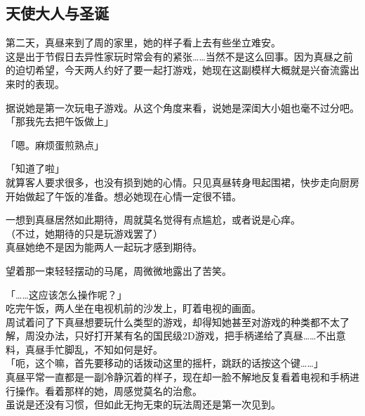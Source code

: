 \subsection{天使大人与圣诞}

第二天，真昼来到了周的家里，她的样子看上去有些坐立难安。\\

这是出于节假日去异性家玩时常会有的紧张……当然不是这么回事。因为真昼之前的迫切希望，今天两人约好了要一起打游戏，她现在这副模样大概就是兴奋流露出来时的表现。

据说她是第一次玩电子游戏。从这个角度来看，说她是深闺大小姐也毫不过分吧。\\

「那我先去把午饭做上」

「嗯。麻烦蛋煎熟点」

「知道了啦」\\

就算客人要求很多，也没有损到她的心情。只见真昼转身甩起围裙，快步走向厨房开始做起了午饭的准备。想必她现在心情一定很不错。

一想到真昼居然如此期待，周就莫名觉得有点尴尬，或者说是心痒。\\

（不过，她期待的只是玩游戏罢了）\\

真昼她绝不是因为能两人一起玩才感到期待。

望着那一束轻轻摆动的马尾，周微微地露出了苦笑。\\

\vspace{2\baselineskip}

「……这应该怎么操作呢？」\\

吃完午饭，两人坐在电视机前的沙发上，盯着电视的画面。\\

周试着问了下真昼想要玩什么类型的游戏，却得知她甚至对游戏的种类都不太了解，周没办法，只好打开某有名的国民级2D游戏，把手柄递给了真昼……不出意料，真昼手忙脚乱，不知如何是好。\\

「呃，这个嘛，首先要移动的话拨动这里的摇杆，跳跃的话按这个键……」\\

真昼平常一直都是一副冷静沉着的样子，现在却一脸不解地反复看着电视和手柄进行操作。看着那样的她，周感觉莫名的治愈。\\

虽说是还没有习惯，但如此无拘无束的玩法周还是第一次见到。\\

